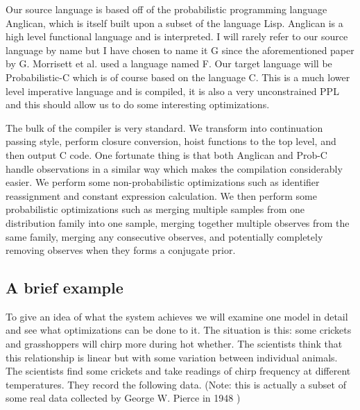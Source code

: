 \documentclass[a4paper]{article}
\begin{document}
Our source language is based off of the probabilistic programming language Anglican, which is itself built upon a subset of the language Lisp. Anglican is a high level functional language and is interpreted. I will rarely refer to our source language by name but I have chosen to name it G since the aforementioned paper by G. Morrisett et al. used a language named F. Our target language will be Probabilistic-C which is of course based on the language C. This is a much lower level imperative language and is compiled, it is also a very unconstrained PPL and this should allow us to do some interesting optimizations.

The bulk of the compiler is very standard. We transform into continuation passing style, perform closure conversion, hoist functions to the top level, and then output C code. One fortunate thing is that both Anglican and Prob-C handle observations in a similar way which makes the compilation considerably easier. We perform some non-probabilistic optimizations such as identifier reassignment and constant expression calculation. We then perform some probabilistic optimizations such as merging multiple samples from one distribution family into one sample, merging together multiple observes from the same family, merging any consecutive observes, and potentially completely removing observes when they forms a conjugate prior.




\subsection{A brief example}

To give an idea of what the system achieves we will examine one model in detail and see what optimizations can be done to it. The situation is this: some crickets and grasshoppers will chirp more during hot whether. The scientists think that this relationship is linear but with some variation between individual animals. The scientists find some crickets and take readings of chirp frequency at different temperatures. They record the following data. (Note: this is actually a subset of some real data collected by George W. Pierce in 1948 \cite{Crickets})
\end{document}
